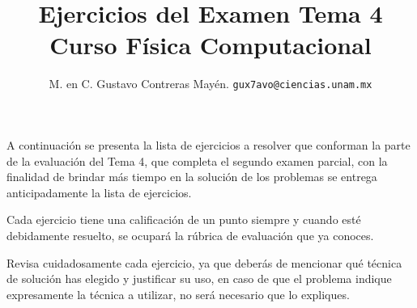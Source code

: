 
\usepackage[siunitx]{circuitikz}
\usetikzlibrary{patterns, arrows}
\usetikzlibrary{decorations.markings}
\usetikzlibrary{matrix}

\title{Ejercicios del Examen Tema 4 \\ {\large Curso Física Computacional}}
\author{M. en C. Gustavo Contreras Mayén. \texttt{gux7avo@ciencias.unam.mx}}

\date{ }


\maketitle
\fontsize{14}{14}\selectfont

A continuación se presenta la lista de ejercicios a resolver que conforman la parte de la evaluación del Tema 4, que completa el segundo examen parcial, con la finalidad de brindar más tiempo en la solución de los problemas se entrega anticipadamente la lista de ejercicios.
\par
Cada ejercicio tiene una calificación de un punto siempre y cuando esté debidamente resuelto, se ocupará la rúbrica de evaluación que ya conoces.
\par
Revisa cuidadosamente cada ejercicio, ya que deberás de mencionar qué técnica de solución has elegido y justificar su uso, en caso de que el problema indique expresamente la técnica a utilizar, no será necesario que lo expliques.

